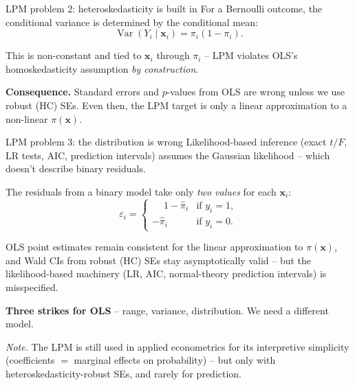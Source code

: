 \documentclass[10pt,ignorenonframetext,aspectratio=169]{beamer}
\begin{document}
\begin{frame}{LPM problem 2: heteroskedasticity is built in}
For a Bernoulli outcome, the conditional variance is determined by the conditional mean:
\[
\operatorname{Var}(Y_i \mid \mathbf{x}_i) = \pi_i(1 - \pi_i).
\]

\medskip
This is non-constant and tied to $\mathbf{x}_i$ through $\pi_i$ -- LPM violates OLS's homoskedasticity assumption \emph{by construction}.

\medskip
\textbf{Consequence.} Standard errors and $p$-values from OLS are wrong unless we use robust (HC) SEs. Even then, the LPM target is only a linear approximation to a non-linear $\pi(\mathbf{x})$.
\end{frame}


\begin{frame}{LPM problem 3: the distribution is wrong}
Likelihood-based inference (exact $t/F$, LR tests, AIC, prediction intervals) assumes the Gaussian likelihood -- which doesn't describe binary residuals.

\medskip
The residuals from a binary model take only \emph{two values} for each $\mathbf{x}_i$:
\[
\varepsilon_i =
\begin{cases}
\phantom{-}1 - \hat{\pi}_i & \text{if } y_i = 1, \\[2pt]
-\hat{\pi}_i               & \text{if } y_i = 0.
\end{cases}
\]

\medskip
OLS point estimates remain consistent for the linear approximation to $\pi(\mathbf{x})$, and Wald CIs from robust (HC) SEs stay asymptotically valid -- but the likelihood-based machinery (LR, AIC, normal-theory prediction intervals) is misspecified.

\medskip
\textbf{Three strikes for OLS} -- range, variance, distribution. We need a different model.

\medskip
{\scriptsize \textit{Note.} The LPM is still used in applied econometrics for its interpretive simplicity (coefficients $=$ marginal effects on probability) -- but only with heteroskedasticity-robust SEs, and rarely for prediction.}
\end{frame}
\end{document}
